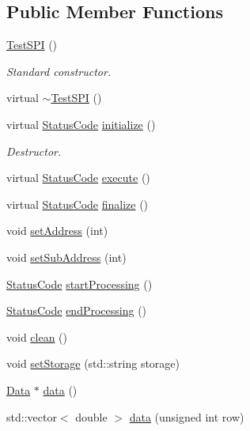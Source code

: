 \subsection*{Public Member Functions}
\begin{DoxyCompactItemize}
\item 
\hyperlink{classTestSPI_a0a4bc6b63f406b3c2830c14873b1ce54}{TestSPI} ()
\begin{DoxyCompactList}\small\item\em Standard constructor. \item\end{DoxyCompactList}\item 
virtual \hyperlink{classTestSPI_af557282f685f8dcfb34fcc846bf91bce}{$\sim$TestSPI} ()
\item 
virtual \hyperlink{classStatusCode}{StatusCode} \hyperlink{classTestSPI_ab2c54cd233a04a583d96fde1f81d4bd6}{initialize} ()
\begin{DoxyCompactList}\small\item\em Destructor. \item\end{DoxyCompactList}\item 
virtual \hyperlink{classStatusCode}{StatusCode} \hyperlink{classTestSPI_afe77bfff2e5454c8b3d012721d1f0a99}{execute} ()
\item 
virtual \hyperlink{classStatusCode}{StatusCode} \hyperlink{classTestSPI_aa07f9e513271f933a9166226505779b0}{finalize} ()
\item 
void \hyperlink{classTestSPI_aaf3401bdea3168f816a4df5a00694c0b}{setAddress} (int)
\item 
void \hyperlink{classTestSPI_aef2329f6379983f05038752a1ca3f190}{setSubAddress} (int)
\item 
\hyperlink{classStatusCode}{StatusCode} \hyperlink{classProcessus_a09319bde9bed93e290f69b4e04585543}{startProcessing} ()
\item 
\hyperlink{classStatusCode}{StatusCode} \hyperlink{classProcessus_a5e4da662989d356b89d490b89c7afbfd}{endProcessing} ()
\item 
void \hyperlink{classProcessus_aaeb17673b98d2b39f3aa780e335e0968}{clean} ()
\item 
void \hyperlink{classProcessus_ad57a29b33f9021eda9f6929136f1784f}{setStorage} (std::string storage)
\item 
\hyperlink{classData}{Data} $\ast$ \hyperlink{classProcessus_a16e45f329fbce935aeef0ff3cb508228}{data} ()
\item 
std::vector$<$ double $>$ \hyperlink{classProcessus_aa7c57483cf4b9ab0b2d0ae2de8316402}{data} (unsigned int row)

\end{DoxyCompactItemize}
